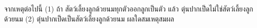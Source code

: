 ﻿%
\question จากเหตุต่อไปนี้ \newline
(1) ถ้า สัตว์เลี้ยงลูกด้วยนมทุกตัวออกลูกเป็นตัว แล้ว ตุ่นปากเป็ดไม่ใช่สัตว์เลี้ยงลูกด้วยนม \newline 
(2) ตุ่นปากเป็ดเป็นสัตว์เลี้ยงลูกด้วยนม \newline
ผลใดสมเหตุสมผล \newline
{}
